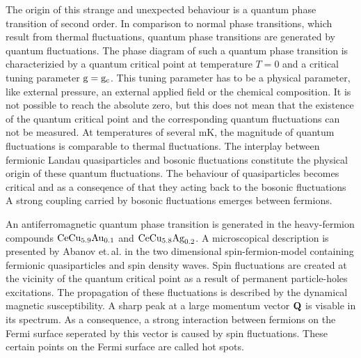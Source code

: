The origin of this strange and unexpected behaviour is a quantum phase transition of second order.
In comparison to normal phase transitions, which result from thermal fluctuations, quantum phase transitions are generated by quantum fluctuations.
The phase diagram of such a quantum phase transition is characterizied by a quantum critical point at temperature $T=0$ and a critical tuning parameter $\mathrm{g}=\mathrm{g}_{\mathrm{c}}$.
This tuning parameter has to be a physical parameter, like external pressure, an external applied field or the chemical composition.
It is not possible to reach the absolute zero, but this does not mean that the existence of the quantum critical point and the corresponding quantum fluctuations can not be measured.
At temperatures of several mK, the magnitude of quantum fluctuations is comparable to thermal fluctuations.
The interplay between fermionic Landau quasiparticles and bosonic fluctuations constitute the physical origin of these quantum fluctuations.
The behaviour of quasiparticles becomes critical and as a conseqence of that they acting back to the bosonic fluctuations \cite{Abrahams&Schmalian&Woelfle}
A strong coupling carried by bosonic fluctuations emerges between fermions.

An antiferromagnetic quantum phase transition is generated in the heavy-fermion compounds $\mathrm{CeCu}_{5.9}\mathrm{Au}_{0.1}$ and $\mathrm{CeCu}_{5.8}\mathrm{Ag}_{0.2}$.
A microscopical description is presented by Abanov et.\,al. \cite{Abanov&Chubukov&Schmalian} in the two dimensional spin-fermion-model containing fermionic quasiparticles and spin density waves.
Spin fluctuations are created at the vicinity of the quantum critical point as a result of permanent particle-holes excitations.
The propagation of these fluctuations is described by the dynamical magnetic susceptibility.
A sharp peak at a large momentum vector $\vb{Q}$ is visable in its spectrum.
As a consequence, a strong interaction between fermions on the Fermi surface seperated by this vector is caused by spin fluctuations.
These certain points on the Fermi surface are called hot spots.

